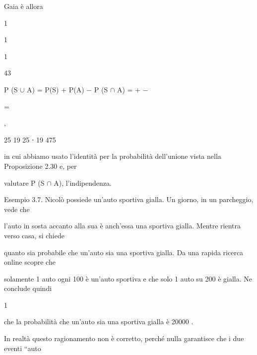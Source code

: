 \documentclass[a4paper,portrait,12pt]{article}
\begin{document}
\begin{flushleft}
Gaia \`{e} allora
\end{flushleft}


1


1


1


43


\begin{flushleft}
P (S $\cup$ A) = P(S) + P(A) $-$ P (S $\cap$ A) = + $-$
\end{flushleft}


=


,


25 19 25 ⋅ 19 475


\begin{flushleft}
in cui abbiamo usato l'identit\`{a} per la probabilit\`{a} dell'unione vista nella Proposizione 2.30 e, per
\end{flushleft}


\begin{flushleft}
valutare P (S $\cap$ A), l'indipendenza.
\end{flushleft}


\begin{flushleft}
Esempio 3.7. Nicol\`{o} possiede un'auto sportiva gialla. Un giorno, in un parcheggio, vede che
\end{flushleft}


\begin{flushleft}
l'auto in sosta accanto alla sua \`{e} anch'essa una sportiva gialla. Mentre rientra verso casa, si chiede
\end{flushleft}


\begin{flushleft}
quanto sia probabile che un'auto sia una sportiva gialla. Da una rapida ricerca online scopre che
\end{flushleft}


\begin{flushleft}
solamente 1 auto ogni 100 \`{e} un'auto sportiva e che solo 1 auto su 200 \`{e} gialla. Ne conclude quindi
\end{flushleft}


1


\begin{flushleft}
che la probabilit\`{a} che un'auto sia una sportiva gialla \`{e} 20000 .
\end{flushleft}


\begin{flushleft}
In realt\`{a} questo ragionamento non \`{e} corretto, perch\'{e} nulla garantisce che i due eventi ``auto
\end{flushleft}
\end{document}
